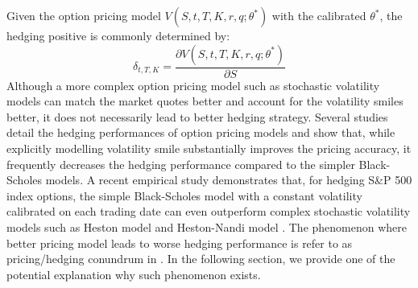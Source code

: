 \documentclass[letterpaper,12pt,titlepage,oneside,final]{book}
\numberwithin{equation}{section}
\theoremstyle{definition}
\begin{document}
Given the option pricing model $V(S,t,T,K,r,q;\theta^*)$ with the calibrated $\theta^*$, the hedging positive is commonly determined by:
\[
\delta_{t,T,K}=  \frac{\partial V(S,t,T,K,r,q;\theta^*)}{\partial S}
\]
Although a more complex option pricing model such as stochastic volatility models can match the market quotes better and account for the volatility smiles better, it does not necessarily lead to better hedging strategy. 
Several studies \cite{dumas1998implied,bakshi1997empirical,yung2003empirical, lassance2018comparison} detail the hedging performances of option pricing models and show that, while explicitly
modelling volatility smile substantially improves the pricing
accuracy, it frequently decreases the hedging
performance compared to the simpler  Black-Scholes models. A recent empirical study \cite{lassance2018comparison} demonstrates that, for hedging S\&P 500 index options, the simple Black-Scholes model with a constant volatility calibrated on each trading date can even outperform complex stochastic volatility models such as Heston model \cite{heston1993closed} and Heston-Nandi model \cite{heston2000closed}. The phenomenon where better pricing model leads to worse hedging performance is refer to as pricing/hedging conundrum in \cite{lassance2018comparison}. In the following section, we provide one of the potential explanation why such phenomenon exists.
\end{document}
